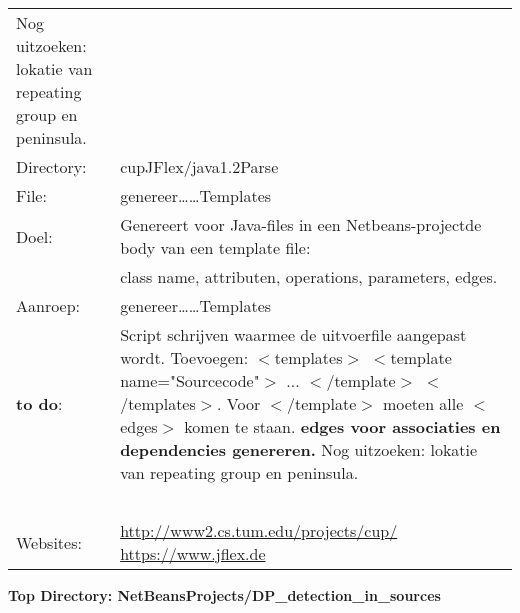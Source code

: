 \documentclass[12pt,a4paper]{report}
\begin{document}
\begin{flushleft}
\begin{tabular} {l p{12cm}}
                    Nog uitzoeken: lokatie van repeating group en peninsula.
\ \\
Directory: & cupJFlex/java1.2Parse \\
File:      & genereer\dots\dots Templates  \\  
Doel:      & Genereert voor Java-files in een Netbeans-projectde body van een template file: \\
& class name, attributen, operations, parameters, edges. \\
Aanroep:   & genereer\dots\dots Templates \\
\textbf{to do}:   & Script schrijven waarmee de uitvoerfile aangepast wordt. \newline
Toevoegen: $<$templates$>$ $<$template name="Sourcecode"$>$ ... $<$/template$>$ $<$/templates$>$. \newline
Voor $<$/template$>$ moeten alle $<$edges$>$ komen te staan. \newline
\textbf{edges voor associaties en dependencies genereren.}
Nog uitzoeken: lokatie van repeating group en peninsula.
\ \\
\ \\
Websites:  & \url{http://www2.cs.tum.edu/projects/cup/}  \newline  \url{https://www.jflex.de} \\
\end{tabular}
\end{flushleft}
\pagebreak
\begin{center}
	\textbf{Top Directory: NetBeansProjects/DP\_detection\_in\_sources}
\end{center}
\end{document}
